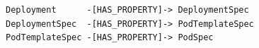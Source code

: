 \begin{lstlisting}[caption={\textit{reasoning\_path}: jalur relasional \textit{Parent}~-\lbrack REL\rbrack->~\textit{Child} untuk kueri Deployment}, label={lst:reasoning-path-example}, frame=single, captionpos=t]
Deployment      -[HAS_PROPERTY]-> DeploymentSpec
DeploymentSpec  -[HAS_PROPERTY]-> PodTemplateSpec
PodTemplateSpec -[HAS_PROPERTY]-> PodSpec
\end{lstlisting}

